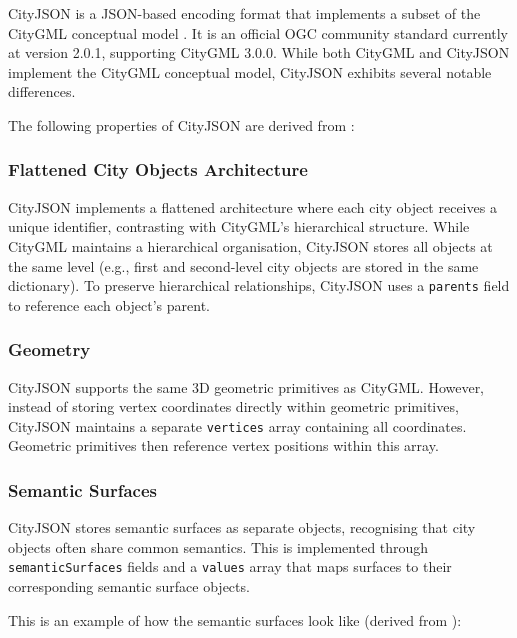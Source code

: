 CityJSON is a JSON-based \citep{json} encoding format that implements a subset of the CityGML conceptual model \citep{CityGML}. It is an official OGC community standard \citep{ogc} currently at version 2.0.1, supporting CityGML 3.0.0. While both CityGML and CityJSON implement the CityGML conceptual model, CityJSON exhibits several notable differences.

The following properties of CityJSON are derived from \citet{ledoux_2019}:

\subsubsection{Flattened City Objects Architecture}
\label{rw:cityjson:flattened_architecture}

CityJSON implements a flattened architecture where each city object receives a unique identifier, contrasting with CityGML's hierarchical structure. While CityGML maintains a hierarchical organisation, CityJSON stores all objects at the same level (e.g., first and second-level city objects are stored in the same dictionary). To preserve hierarchical relationships, CityJSON uses a \texttt{parents} field to reference each object's parent.

\subsubsection{Geometry}
\label{rw:cityjson:geometry}

CityJSON supports the same 3D geometric primitives as CityGML. However, instead of storing vertex coordinates directly within geometric primitives, CityJSON maintains a separate \texttt{vertices} array containing all coordinates. Geometric primitives then reference vertex positions within this array.

\subsubsection{Semantic Surfaces}
\label{rw:cityjson:semantic_surfaces}

CityJSON stores semantic surfaces as separate objects, recognising that city objects often share common semantics. This is implemented through \texttt{semanticSurfaces} fields and a \texttt{values} array that maps surfaces to their corresponding semantic surface objects.

This is an example of how the semantic surfaces look like (derived from \citet{ledoux_2019}):

